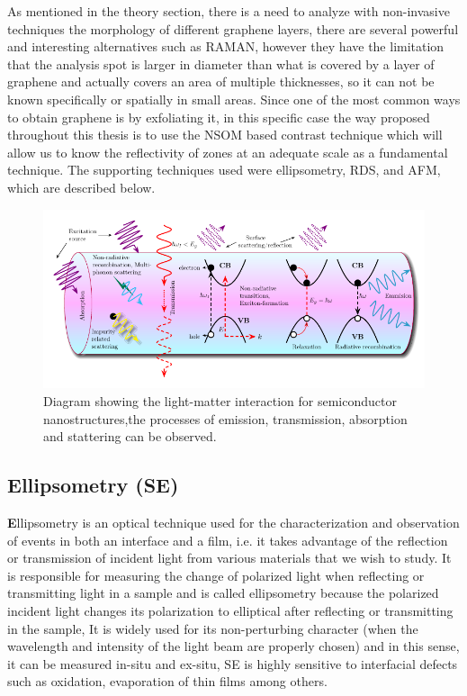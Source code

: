 As mentioned in the theory section, there is a need to analyze with non-invasive techniques the morphology of different graphene layers, there are several powerful and interesting alternatives such as RAMAN, however they have the limitation that the analysis spot is larger in diameter than what is covered by a layer of graphene and actually covers an area of multiple thicknesses, so it can not be known specifically or spatially in small areas. Since one of the most common ways to obtain graphene is by exfoliating it, in this specific case the way proposed throughout this thesis is to use the NSOM based contrast technique which will allow us to know the reflectivity of zones at an adequate scale as a fundamental technique. The supporting techniques used were ellipsometry, RDS, and AFM, which are described below.    


\begin{figure}[H]
	\centering
	\includegraphics[width=0.8\linewidth]{FIGURES/Characterization_techniques/spectroscopies}
	\caption{Diagram showing the light-matter interaction for semiconductor nanostructures,the processes of emission, transmission, absorption and stattering can be observed.\cite{cardona2005fundamentals,yi2012semiconductor,sivadasan2017optical}}
	\label{fig:schematic-light-matter}
\end{figure}


\subsection{Ellipsometry (SE)}
\vspace{-1cm}
\lettrine[lines=3, lraise=0.1, nindent=0mm, slope=0mm]{\textbf{E}}{}llipsometry is an optical technique used for the characterization and observation of events in both an interface and a film, i.e. it takes advantage of the reflection or transmission of incident light from various materials that we wish to study. It is responsible for measuring the change of polarized light when reflecting or transmitting light in a sample and is called ellipsometry because the polarized incident light changes its polarization to elliptical after reflecting or transmitting in the sample,  It is widely used for its non-perturbing character \cite{azzam1978ellipsometry} (when the wavelength and intensity of the light beam are properly chosen) and in this sense, it can be measured in-situ and ex-situ, SE is highly sensitive to interfacial defects such as oxidation, evaporation of thin films among others\cite{fujiwara2007spectroscopic}.



